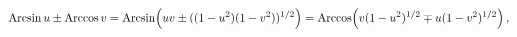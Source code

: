 \[\mathop{\mathrm{Arcsin}\/}\nolimits u\pm\mathop{\mathrm{Arccos}\/}\nolimits v=%
\mathop{\mathrm{Arcsin}\/}\nolimits\!\left(uv\pm((1-u^{2})(1-v^{2}))^{1/2}%
\right)=\mathop{\mathrm{Arccos}\/}\nolimits\!\left(v(1-u^{2})^{1/2}\mp u(1-v^{%
2})^{1/2}\right),\]